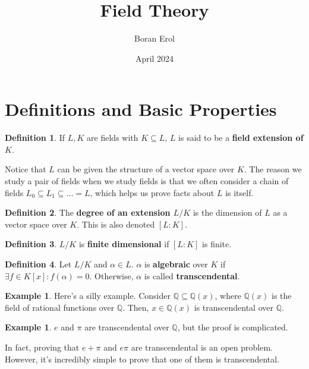 \documentclass{article}
\title{Field Theory}
\date{April 2024}
\author{Boran Erol}
\theoremstyle{definition}
\newtheorem{definition}{Definition}
\newtheorem{example}[theorem]{Example}
\newcommand{\Q}{\mathbb{Q}}
\begin{document}
\maketitle

\section{Definitions and Basic Properties}

\begin{definition}
    If $L,K$ are fields with $K \subseteq L$, $L$ is said to be a \textbf{field extension of $K$}.
\end{definition}

Notice that $L$ can be given the structure of a vector space over $K$. The reason we study a pair of fields
when we study fields is that we often consider a chain of fields $L_{0} \subseteq L_{1} \subseteq ... = L$,
which helps us prove facts about $L$ is itself.

\begin{definition}
    The \textbf{degree of an extension $L/K$} is the dimension of $L$ as a vector space over $K$. 
    This is also denoted $[L : K]$.
\end{definition}

\begin{definition}
    $L/K$ is \textbf{finite dimensional} if $[L : K]$ is finite.
\end{definition}

\begin{definition}
    Let $L/K$ and $\alpha \in L$. $\alpha$ is \textbf{algebraic} over $K$ if $\exists f \in K[x]: f(\alpha) = 0$.
    Otherwise, $\alpha$ is called \textbf{transcendental}.
\end{definition}

\begin{example}
    Here's a silly example. Consider $\Q \subseteq \Q(x)$, where $\Q(x)$ is the field of rational functions
    over $\Q$. Then, $x \in \Q(x)$ is transcendental over $\Q$.
\end{example}

\begin{example}
    $e$ and $\pi$ are transcendental over $\Q$, but the proof is complicated. 
\end{example}

In fact, proving that $e + \pi$ and $e \pi$ are transcendental is an open problem.
However, it's incredibly simple to prove that one of them is transcendental.
\end{document}
